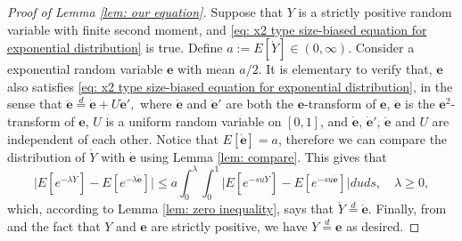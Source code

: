 \documentclass[12pt,a4paper]{amsart}
\numberwithin{equation}{section}
\begin{document}
\begin{proof}[Proof of Lemma \ref{lem: our equation}]
	Suppose that $Y$ is a strictly positive random variable with finite second moment, and \eqref{eq: x2 type size-biased equation for exponential distribution} is true.
	Define 
$
	a 
	:= E[\dot Y] \in (0,\infty)
$.
 	Consider a exponential random variable $\mathbf e$ with mean $a/2$.
	It is elementary to verify that, $\mathbf e$ also satisfies \eqref{eq: x2 type size-biased equation for exponential distribution}, in the sense that
$
	\ddot {\mathbf e} \overset{d} = \dot {\mathbf e}+U\dot {\mathbf e}', 
$
	where $\dot {\mathbf e}$ and $\dot {\mathbf e}'$ are both the $\mathbf e$-transform of $\mathbf e$, $\ddot {\mathbf e}$ is the $\mathbf e^2$-transform of $\mathbf e$, $U$ is a uniform random variable on $[0,1]$, and $\dot {\mathbf e}$, $\dot {\mathbf e}'$, $\ddot {\mathbf e}$ and $U$ are independent of each other.
	Notice that $E[\dot {\mathbf e}] = a$, therefore we can compare the distribution of $\dot Y$ with $\dot {\mathbf e}$ using Lemma \ref{lem: compare}.
	This gives that
\[
	\big|E[ e^{-\lambda \dot Y}] - E[ e^{-\lambda \dot {\mathbf e}}] \big| 
	\leq  a  \int_0^\lambda \int_0^1 \big| E [e^{-s u \dot Y}] - E [e^{-s u \dot {\mathbf e}}] \big| du ds,
	\quad \lambda \geq 0,
\]
	which, according to Lemma \ref{lem: zero inequality}, says that %
	$\dot Y \overset{d} = \dot {\mathbf e}$.
	Finally, from \cite[Lemma 2.6]{ArratiaGoldsteinKochman2013} and the fact that $Y$ and $\mathbf e$ are strictly positive, we have
	$Y \overset{d} = \mathbf e$ as desired.
\end{proof}
\end{document}
